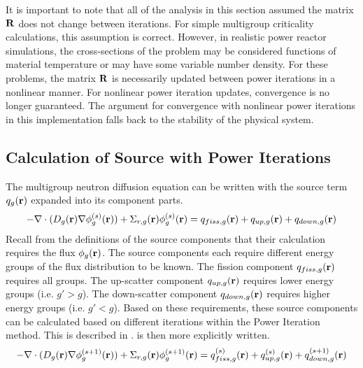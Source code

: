     It is important to note that all of the analysis in this section assumed the
    matrix $\mathbf{R}$ does not change between iterations. For simple multigroup
    criticality calculations, this assumption is correct. However, in realistic
    power reactor simulations, the cross-sections of the problem may be 
    considered functions of material temperature or may have some variable
    number density. For these problems, the matrix $\mathbf{R}$ is necessarily updated
    between power iterations in a nonlinear manner. For nonlinear power
    iteration updates, convergence is no longer guaranteed. The argument for
    convergence with nonlinear power iterations in this implementation falls 
    back to the stability of the physical system.
    
  \subsection{Calculation of Source with Power Iterations}

    The multigroup neutron diffusion equation  can be
    written with the source term $q_g(\mathbf{r})$ expanded into its component parts.
    \begin{equation} \label{eq:multigroup_source_expand}
      -\mathbf{\nabla} \cdot (D_g(\mathbf{r}) \mathbf{\nabla} \phi_g^{(s)}(\mathbf{r})) + \Sigma_{r,g}(\mathbf{r})
      \phi_g^{(s)}(\mathbf{r}) = q_{fiss,g}(\mathbf{r}) + q_{up,g}(\mathbf{r}) + q_{down,g}(\mathbf{r})
    \end{equation}
    Recall from the definitions of the source components that their calculation
    requires the flux $\phi_g(\mathbf{r})$. The source components each require
    different energy groups of the flux distribution to be known. The fission
    component $q_{fiss,g}(\mathbf{r})$ requires all groups. The up-scatter component
    $q_{up,g}(\mathbf{r})$ requires lower energy groups (i.e. $g' > g$). The
    down-scatter component $q_{down,g}(\mathbf{r})$ requires higher energy groups (i.e.
    $g' < g$). Based on these requirements, these source components can be
    calculated based on different iterations within the Power Iteration method.
    This is described in .
     is then more explicitly written.
    \begin{equation} 
      \label{eq:multigroup_power_iterations}
      -\mathbf{\nabla} \cdot (D_g(\mathbf{r}) \mathbf{\nabla} \phi_g^{(s+1)}(\mathbf{r})) + \Sigma_{r,g}(\mathbf{r})
      \phi_g^{(s+1)}(\mathbf{r}) = q_{fiss,g}^{(s)}(\mathbf{r}) + q_{up,g}^{(s)}(\mathbf{r}) +
      q_{down,g}^{(s+1)}(\mathbf{r})
    \end{equation}


